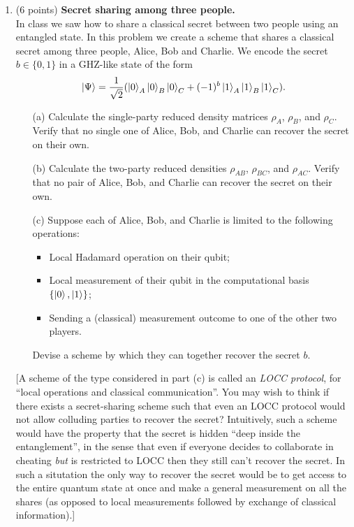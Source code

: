 \documentclass[12pt]{article}
\begin{document}
\begin{enumerate}
\item (6 points) \textbf{Secret sharing among three people.}\\
In class we saw how to share a classical secret between two people using an entangled state. In this problem we create a scheme that shares a classical secret among three people, Alice, Bob and Charlie. We encode the secret $b\in \{0,1\}$ in a GHZ-like state of the form
\[
\ket{\Psi} = \frac{1}{\sqrt{2}}(\ket{0}_A\ket{0}_B\ket{0}_C+ (-1)^b\ket{1}_A\ket{1}_B\ket{1}_C).
\]
\begin{enumerate}
\item[(a)] Calculate the single-party reduced density matrices $\rho_A$, $\rho_B$, and $\rho_C$. Verify that no single one of Alice, Bob, and Charlie can recover the secret on their own.
\item[(b)] Calculate the two-party reduced densities $\rho_{AB}$, $\rho_{BC}$, and $\rho_{AC}$. Verify that no pair of Alice, Bob, and Charlie can recover the secret on their own.
\item[(c)] Suppose each of Alice, Bob, and Charlie is limited to the following operations:
	\begin{itemize}
	\item Local Hadamard operation on their qubit;
	\item Local measurement of their qubit in the computational basis $\{\ket{0},\ket{1}\}$;
	\item Sending a (classical) measurement outcome to one of the other two players.
	\end{itemize}
Devise a scheme by which they can together recover the secret $b$. 
\end{enumerate}
[A scheme of the type considered in part (c) is called an \emph{LOCC protocol}, for ``local operations and classical communication''. You may wish to think if there exists a secret-sharing scheme such that even an LOCC protocol would not allow colluding parties to recover the secret? Intuitively, such a scheme would have the property that the secret is hidden ``deep inside the entanglement'', in the sense that even if everyone decides to collaborate in cheating \emph{but} is restricted to LOCC then they still can't recover the secret. In such a situtation the only way to recover the secret would be to get access to the entire quantum state at once and make a general measurement on all the shares (as opposed to local measurements followed by exchange of classical information).]



\end{enumerate}
\end{document}
